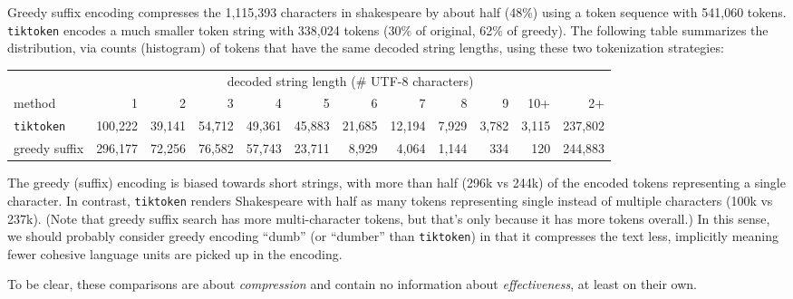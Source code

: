 \documentclass[11pt, oneside]{amsart}   	%
\begin{document}
Greedy suffix encoding compresses the 1,115,393 characters in shakespeare by about half (48\%) using a token sequence with 541,060 tokens. \texttt{tiktoken} encodes a much smaller token string with 338,024 tokens (30\% of original, 62\% of greedy). The following table summarizes the distribution, via counts (histogram) of tokens that have the same decoded string lengths, using these two tokenization strategies: 
\begin{center}
\begin{small}
\begin{tabular}{ l r r r r r r r r r r r }
& \multicolumn{11}{c}{decoded string length (\# UTF-8 characters)} \\ \cline{2-12}
method & 1 & 2 & 3 & 4 & 5 & 6 & 7 & 8 & 9 & 10+ & 2+ \\ \hline
\texttt{tiktoken} & 100,222 & 39,141 & 54,712 & 49,361 & 45,883 & 21,685 & 12,194 & 7,929 & 3,782 & 3,115 & 237,802 \\
greedy suffix & 296,177 & 72,256 & 76,582 & 57,743 & 23,711 & 8,929 & 4,064 & 1,144 & 334 & 120 & 244,883 \\  \hline
\end{tabular}
\end{small}
\end{center}

The greedy (suffix) encoding is biased towards short strings, with more than half (296k vs 244k) of the encoded tokens representing a single character. In contrast, \texttt{tiktoken} renders Shakespeare with half as many tokens representing single instead of multiple characters (100k vs 237k). (Note that greedy suffix search has more multi-character tokens, but that's only because it has more tokens overall.) In this sense, we should probably consider greedy encoding ``dumb'' (or ``dumber'' than \texttt{tiktoken}) in that it compresses the text less, implicitly meaning fewer cohesive language units are picked up in the encoding. 

To be clear, these comparisons are about {\em compression} and contain no information about {\em effectiveness}, at least on their own. 
\end{document}
